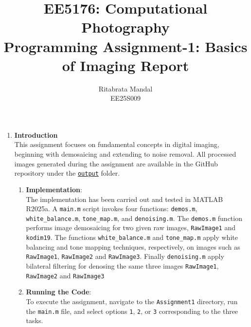 \documentclass[11pt, a4]{article}
\begin{document}
	\pagestyle{fancy}
	\fancyhead{}\fancyfoot{}
	\author{Ritabrata Mandal\\ EE25S009}
	\title{EE5176: Computational Photography\\Programming Assignment-1: Basics of Imaging Report}
	\maketitle
	
	\medskip
	\begin{enumerate}
		\item \textbf{Introduction}\\
		This assignment focuses on fundamental concepts in digital imaging, beginning with demosaicing and extending to noise removal. 
		All processed images generated during the assignment are available in the GitHub repository under the 
		\href{https://github.com/RitabrataMandal/EE5176/tree/master/Assignments/Assignment1/output}{\texttt{output}} folder.  
		
		\begin{enumerate}
			\item \textbf{Implementation}:\\
			The implementation has been carried out and tested in MATLAB R2025a. 
			A \texttt{main.m} script invokes four functions: \texttt{demos.m}, \texttt{white\_balance.m}, 
			\texttt{tone\_map.m}, and \texttt{denoising.m}. 
			The \texttt{demos.m} function performs image demosaicing for two given raw images, \texttt{RawImage1} and \texttt{kodim19}. 
			The functions \texttt{white\_balance.m} and \texttt{tone\_map.m} apply white balancing and tone mapping techniques, respectively, 
			on images such as \texttt{RawImage1}, \texttt{RawImage2} and \texttt{RawImage3}. Finally \texttt{denoising.m} apply bilateral filtering for denosing the same three images \texttt{RawImage1}, \texttt{RawImage2} and \texttt{RawImage3} 
			
			\item \textbf{Running the Code}:\\
			To execute the assignment, navigate to the \texttt{Assignment1} directory, run the \texttt{main.m} file, 
			and select options \texttt{1}, \texttt{2}, or \texttt{3} corresponding to the three tasks.
		\end{enumerate}
		

\end{enumerate}
\end{document}
